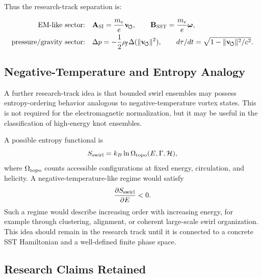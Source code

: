     Thus the research-track separation is:
    
    \begin{align}
        \text{EM-like sector:}
        \quad
        &\mathbf{A}_{\rm SI}
        =
        \frac{m_e}{e}\mathbf{v}_{\!\boldsymbol{\circlearrowleft}},
        \qquad
        \mathbf{B}_{\rm SST}
        =
        \frac{m_e}{e}\boldsymbol{\omega},
        \label{eq:em_sector_summary}
        \\
        \text{pressure/gravity sector:}
        \quad
        &\Delta p
        =
        -
        \frac{1}{2}\rho_{\!f}
        \Delta(\lVert\mathbf{v}_{\!\boldsymbol{\circlearrowleft}}\rVert^2),
        \qquad
        d\tau/dt
        =
        \sqrt{1-\lVert\mathbf{v}_{\!\boldsymbol{\circlearrowleft}}\rVert^2/c^2}.
        \label{eq:pressure_gravity_sector_summary}
    \end{align}

\subsection{Negative-Temperature and Entropy Analogy}
    
    A further research-track idea is that bounded swirl ensembles may possess
    entropy-ordering behavior analogous to negative-temperature vortex states.
    This is not required for the electromagnetic normalization, but it may be
    useful in the classification of high-energy knot ensembles.
    
    A possible entropy functional is
    \begin{equation}
        S_{\rm swirl}
        =
        k_B\ln\Omega_{\rm topo}(E,\Gamma,\mathcal{H}),
        \label{eq:swirl_entropy}
    \end{equation}
    where \(\Omega_{\rm topo}\) counts accessible configurations at fixed
    energy, circulation, and helicity.  A negative-temperature-like regime
    would satisfy
    \begin{equation}
        \frac{\partial S_{\rm swirl}}{\partial E}
        <
        0.
        \label{eq:negative_temperature_condition}
    \end{equation}
    Such a regime would describe increasing order with increasing energy,
    for example through clustering, alignment, or coherent large-scale swirl
    organization.  This idea should remain in the research track until it is
    connected to a concrete SST Hamiltonian and a well-defined finite phase
    space.

\subsection{Research Claims Retained}
    
